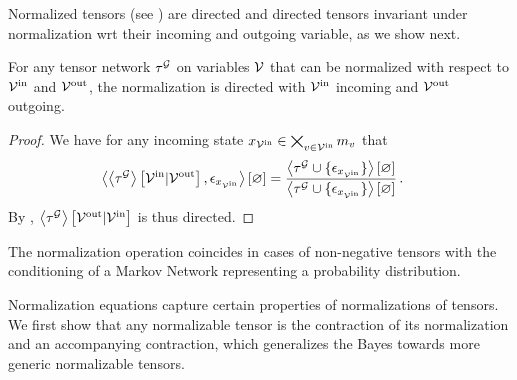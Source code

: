 Normalized tensors (see ) are directed and directed tensors invariant under normalization wrt their incoming and outgoing variable, as we show next.

\begin{theorem}
    \label{the:normalizationDirected}
    For any tensor network $\tau^{\mathcal{G}}$ on variables $\mathcal{V}$ that can be normalized with respect to $\mathcal{V}^{\mathrm{in}}$ and $\mathcal{V}^{\mathrm{out}}$, the normalization is directed with $\mathcal{V}^{\mathrm{in}}$ incoming and $\mathcal{V}^{\mathrm{out}}$ outgoing.
\end{theorem}
\begin{proof}
    We have for any incoming state ${x_{\mathcal{V}^{\mathrm{in}}}\in\bigtimes_{v\in\mathcal{V}^{\mathrm{in}}}m_{v}}$ that
    \begin{align*}
        \left\langle \left\langle \tau^{\mathcal{G}}\right\rangle \left[ \mathcal{V}^{\mathrm{in}} | \mathcal{V}^{\mathrm{out}} \right], \epsilon_{x_{\mathcal{V}^{\mathrm{in}}}}\right\rangle \left[ \varnothing \right]
        & =  \frac{
            \left\langle \tau^{\mathcal{G}}\cup\{\epsilon_{x_{\mathcal{V}^{\mathrm{in}}}}\}\right\rangle \left[ \varnothing \right]
        }{
            \left\langle \tau^{\mathcal{G}}\cup\{\epsilon_{x_{\mathcal{V}^{\mathrm{in}}}}\}\right\rangle \left[ \varnothing \right]
        } \, .
    \end{align*}
    By , $\left\langle \tau^{\mathcal{G}}\right\rangle \left[ \mathcal{V}^{\mathrm{out}} | \mathcal{V}^{\mathrm{in}} \right]$ is thus directed.
\end{proof}

The normalization operation coincides in cases of non-negative tensors with the conditioning of a Markov Network representing a probability distribution.


Normalization equations capture certain properties of normalizations of tensors.
We first show that any normalizable tensor is the contraction of its normalization and an accompanying contraction, which generalizes the Bayes  towards more generic normalizable tensors.


